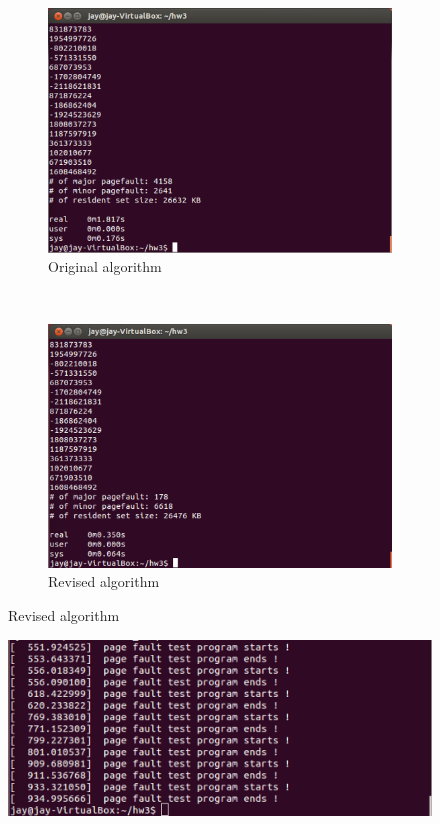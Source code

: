 \documentclass{article}
\renewcommand{\_}{\textscale{.5}{\textunderscore}}
\begin{document}
\begin{figure}[!htb]
    \centering
    \begin{subfigure}[b]{0.49\textwidth}
        \includegraphics[width=\textwidth]{img/128.png}
        \caption{Original algorithm}
    \end{subfigure}
    ~
    \begin{subfigure}[b]{0.49\textwidth}
        \includegraphics[width=\textwidth]{img/2048.png}
        \caption{Revised algorithm}
    \end{subfigure}
\end{figure}

\begin{figure}[!htb]
    \includegraphics[width=\textwidth]{img/test.png}
\end{figure}
\end{document}

